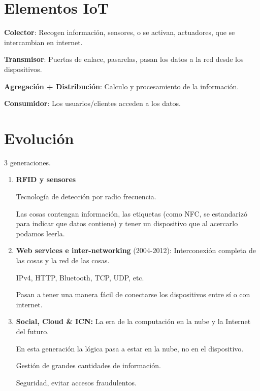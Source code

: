 \documentclass[12pt]{report} %
\begin{document}
\section{Elementos IoT}

\textbf{Colector}: Recogen información, sensores, o se activan,
actuadores, que se intercambian en internet.

\textbf{Transmisor}: Puertas de enlace, pasarelas, pasan los datos a la
red desde los dispositivos.

\textbf{Agregación + Distribución}: Calculo y procesamiento de la
información.

\textbf{Consumidor}: Los usuarios/clientes acceden a los datos.

\section{Evolución}

3 generaciones.

\begin{enumerate}
\def\labelenumi{\arabic{enumi}.}
\item
  \textbf{RFID y sensores}

  Tecnología de detección por radio frecuencia.

  Las cosas contengan información, las etiquetas (como NFC, se
  estandarizó para indicar que datos contiene) y tener un dispositivo
  que al acercarlo podamos leerla.
\item
  \textbf{Web services e inter-networking} (2004-2012): Interconexión
  completa de las cosas y la red de las cosas.

  IPv4, HTTP, Bluetooth, TCP, UDP, etc.

  Pasan a tener una manera fácil de conectarse los dispositivos entre sí
  o con internet.
\item
  \textbf{Social, Cloud \& ICN:} La era de la computación en la nube y
  la Internet del futuro.

  En esta generación la lógica pasa a estar en la nube, no en el
  dispositivo.

  Gestión de grandes cantidades de información.

  Seguridad, evitar accesos fraudulentos.
\end{enumerate}
\end{document}
